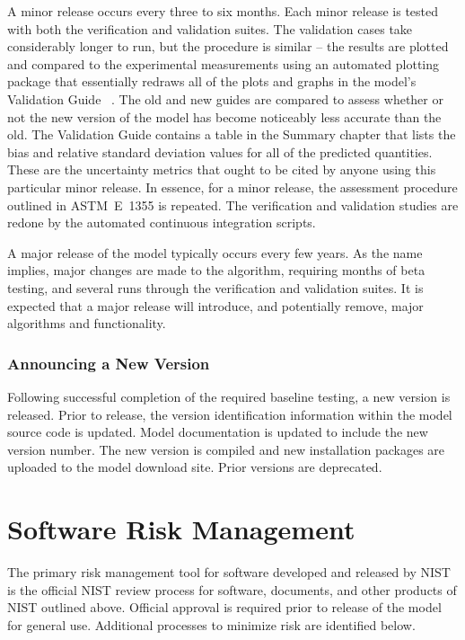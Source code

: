 \documentclass[11pt]{book}
\begin{document}
A minor release occurs every three to six months. Each minor release is tested with both the verification and validation suites. The validation cases take considerably longer to run, but the procedure is similar -- the results are plotted and compared to the experimental measurements using an automated plotting package that essentially redraws all of the plots and graphs in the model's Validation Guide~\cite{FDS_Validation_Guide} \cite{CFAST_Valid_Guide_7}. The old and new guides are compared to assess whether or not the new version of the model has become noticeably less accurate than the old. The Validation Guide contains a table in the Summary chapter that lists the bias and relative standard deviation values for all of the predicted quantities. These are the uncertainty metrics that ought to be cited by anyone using this particular minor release. In essence, for a minor release, the assessment procedure outlined in ASTM~E~1355 is repeated. The verification and validation studies are redone by the automated continuous integration scripts.

A major release of the model typically occurs every few years. As the name implies, major changes are made to the algorithm, requiring months of beta testing, and several runs through the verification and validation suites. It is expected that a major release will introduce, and potentially remove, major algorithms and functionality.


\subsection{Announcing a New Version}

Following successful completion of the required baseline testing, a new version is released.  Prior to release, the version identification information within the model source code is updated.  Model documentation is updated to include the new version number.  The new version is compiled and new installation packages are uploaded to the model download site.  Prior versions are deprecated.



\chapter{Software Risk Management}

The primary risk management tool for software developed and released by NIST is the official NIST review process for software, documents, and other products of NIST outlined above. Official approval is required prior to release of the model for general use. Additional processes to minimize risk are identified below.
\end{document}
